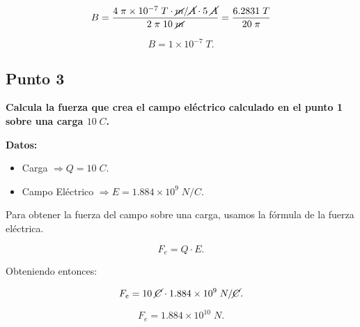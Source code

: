 \documentclass[a4paper,12pt]{article} %
\begin{document}
\[B = \frac{4 \; \pi \times 10^{-7} \; T \cdot \cancel{m} / \cancel{A} \cdot 5 \; \cancel{A}}{2 \; \pi \; 10 \; \cancel{m}} = \frac{6.2831 \; T}{20 \; \pi}\]

\vspace{\baselineskip}

\[\boxed{B = 1 \times 10^{-7} \; T.} \]

\newpage

\subsection*{Punto 3}

\vspace{\baselineskip}

\begin{justify}
\textbf{Calcula la fuerza que crea el campo eléctrico calculado en el punto 1 sobre una carga \(10 \; C\).}
\end{justify}

\vspace{\baselineskip}

\begin{justify}
    \textbf{Datos:}
\end{justify}

\begin{itemize}
    \item Carga \( \Rightarrow Q = 10 \; C.\)
    \item Campo Eléctrico \( \Rightarrow E = 1.884 \times 10^9 \; N/C.\)
\end{itemize}

\begin{justify}
    Para obtener la fuerza del campo sobre una carga, usamos la fórmula de la fuerza eléctrica.
\end{justify}

\[F_e = Q \cdot E.\]

\vspace{\baselineskip}

\begin{justify}
    Obteniendo entonces:
\end{justify}

\[F_e = 10 \; \cancel{C} \cdot 1.884 \times 10^9 \; N/ \cancel{C}.\]

\vspace{\baselineskip}

\[\boxed{F_e = 1.884 \times 10^{10} \; N.}\]

\vspace{\baselineskip}
\end{document}
